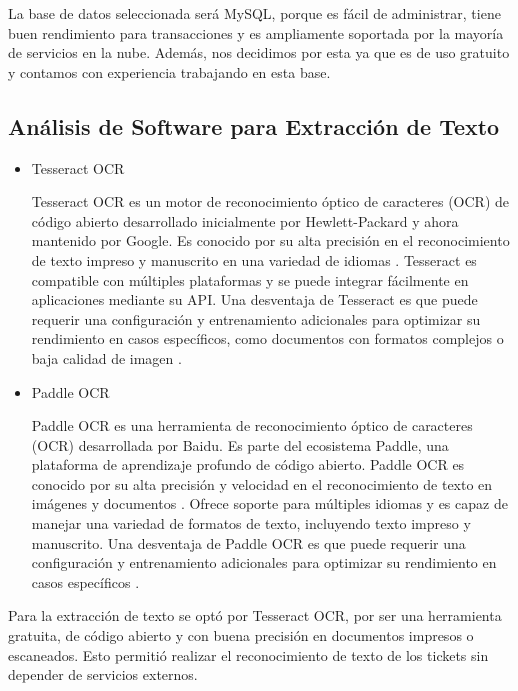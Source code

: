 La base de datos seleccionada será MySQL, porque es fácil de administrar, tiene buen rendimiento para transacciones y es ampliamente soportada por la mayoría de 
servicios en la nube. Además, nos decidimos por esta ya que es de uso gratuito y contamos con experiencia trabajando en esta base.

\subsection{Análisis de Software para Extracción de Texto}

\begin{itemize}
    \item Tesseract OCR
    
    Tesseract OCR es un motor de reconocimiento óptico de caracteres (OCR) de código abierto desarrollado inicialmente por Hewlett-Packard y ahora mantenido por Google.
    Es conocido por su alta precisión en el reconocimiento de texto impreso y manuscrito en una variedad de idiomas \cite{Tesseract}. Tesseract es compatible con múltiples 
    plataformas y se puede integrar fácilmente en aplicaciones mediante su API. Una desventaja de Tesseract es que puede requerir una configuración y entrenamiento 
    adicionales para optimizar su rendimiento en casos específicos, como documentos con formatos complejos o baja calidad de imagen \cite{Tesseract}.

    \item Paddle OCR
    
    Paddle OCR es una herramienta de reconocimiento óptico de caracteres (OCR) desarrollada por Baidu. Es parte del ecosistema Paddle, una plataforma de aprendizaje
    profundo de código abierto. Paddle OCR es conocido por su alta precisión y velocidad en el reconocimiento de texto en imágenes y documentos \cite{PaddleOCR}.
    Ofrece soporte para múltiples idiomas y es capaz de manejar una variedad de formatos de texto, incluyendo texto impreso y manuscrito. Una desventaja de Paddle OCR es 
    que puede requerir una configuración y entrenamiento adicionales para optimizar su rendimiento en casos específicos \cite{PaddleOCR}.

\end{itemize}

Para la extracción de texto se optó por Tesseract OCR, por ser una herramienta gratuita, de código abierto y con buena precisión en documentos impresos o escaneados. 
Esto permitió realizar el reconocimiento de texto de los tickets sin depender de servicios externos.

